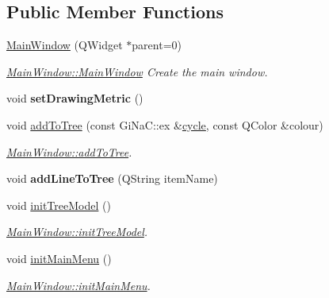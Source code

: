 \subsection*{Public Member Functions}
\begin{DoxyCompactItemize}
\item 
\mbox{\hyperlink{class_main_window_a8b244be8b7b7db1b08de2a2acb9409db}{Main\+Window}} (Q\+Widget $\ast$parent=0)
\begin{DoxyCompactList}\small\item\em \mbox{\hyperlink{class_main_window_a8b244be8b7b7db1b08de2a2acb9409db}{Main\+Window\+::\+Main\+Window}} Create the main window. \end{DoxyCompactList}\item 
\mbox{\label{class_main_window_af7d2eb4ee3fb3cc4f0b83deffdb81ae8}} 
void {\bfseries set\+Drawing\+Metric} ()
\item 
void \mbox{\hyperlink{class_main_window_a816f983db7e31a8a3e8376538b44804f}{add\+To\+Tree}} (const Gi\+Na\+C\+::ex \&\mbox{\hyperlink{class_moeb_inv_1_1cycle}{cycle}}, const Q\+Color \&colour)
\begin{DoxyCompactList}\small\item\em \mbox{\hyperlink{class_main_window_a816f983db7e31a8a3e8376538b44804f}{Main\+Window\+::add\+To\+Tree}}. \end{DoxyCompactList}\item 
\mbox{\label{class_main_window_ad322f29d75b06348ee43ce911a1cc36f}} 
void {\bfseries add\+Line\+To\+Tree} (Q\+String item\+Name)
\item 
void \mbox{\hyperlink{class_main_window_a3e45090789e16c49079857ab0617b239}{init\+Tree\+Model}} ()
\begin{DoxyCompactList}\small\item\em \mbox{\hyperlink{class_main_window_a3e45090789e16c49079857ab0617b239}{Main\+Window\+::init\+Tree\+Model}}. \end{DoxyCompactList}\item 
void \mbox{\hyperlink{class_main_window_ae78352e402084a7c6518e97056070677}{init\+Main\+Menu}} ()
\begin{DoxyCompactList}\small\item\em \mbox{\hyperlink{class_main_window_ae78352e402084a7c6518e97056070677}{Main\+Window\+::init\+Main\+Menu}}. \end{DoxyCompactList}\item 

\end{DoxyCompactItemize}
